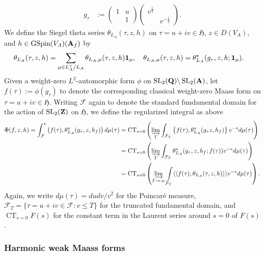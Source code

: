\documentclass{amsart}
\theoremstyle{definition}
\begin{document}
\begin{align*} g_{\tau} 
&:= \left( \begin{array}{cc} 1 & u \\ ~& 1\end{array} \right) \left( \begin{array}{cc} v^{\frac{1}{2}} & ~ \\~& v^{- \frac{1}{2}}\end{array} \right). \end{align*}
We define the Siegel theta series $\theta_{L_A}(\tau, z, h)$ on $\tau = u + iv \in \mathfrak{H}$, 
$z \in D(V_A)$, and $h \in \operatorname{GSpin}(V_A)({\bf{A}}_f)$ by
\begin{align}\label{classicalsiegeltheta} \theta_{L_A}(\tau, z, h) 
&= \sum\limits_{\mu \in L_A^{\vee}/L_A} \theta_{L_A, \mu}(\tau, z, h) {\bf{1}}_{\mu}, 
\quad \theta_{L_A, \mu}(\tau, z, h) = \theta_{L_A}^{\star}(g_{\tau}, z, h; {\bf{1}}_{\mu}).\end{align}
Given a weight-zero $L^2$-automorphic form $\phi$ on $\operatorname{SL}_2({\bf{Q}}) \backslash \operatorname{SL}_2({\bf{A}})$,
let $f(\tau) := \phi(g_{\tau})$ to denote the corresponding classical weight-zero Maass form on $\tau = u + i v \in \mathfrak{H}$. 
Writing $\mathcal{F}$ again to denote the standard fundamental domain for the action of $\operatorname{SL}_2({\bf{Z}})$ on $\mathfrak{H}$, 
we define the regularized integral as above
\begin{align*} \Phi(f, z, h) = \int_{\mathcal{F}}^{\star}\left( f(\tau), \theta_{L_A}^{\star}(g_{\tau}, z, h_f) \right) d \mu(\tau) 
&= \operatorname{CT}_{s=0} \left( \varinjlim_T \int_{\mathcal{F}_T} \left\{ f(\tau), \theta_{L_A}^{\star}(g_{\tau}z, h_f) \right \}  v^{-s} d \mu(\tau) \right) \\
&= \operatorname{CT}_{s=0} \left( \varinjlim_T \int_{\mathcal{F}_T} \theta_{L_A}^{\star}(g_{\tau}, z, h_f; f(\tau)) v^{-s} d \mu(\tau) \right) \\
&= \operatorname{CT}_{s=0} \left( \varinjlim_{T\rightarrow \infty} \int\limits_{\mathcal{F}_T} \langle \langle f(\tau), \theta_{L_A}(\tau, z, h) \rangle \rangle v^{-s} d \mu(\tau) \right). \end{align*}
Again, we write $d \mu(\tau) = du dv/v^2$ for the Poincar\'e measure, $\mathcal{F}_T = \lbrace \tau = u+iv \in \mathcal{F}: v \leq T \rbrace$ for the truncated fundamental domain,
and $\operatorname{CT}_{s=0} F(s)$ for the constant term in the Laurent series around $s=0$ of $F(s)$.

\subsubsection{Harmonic weak Maass forms}\label{HWMF}
\end{document}
